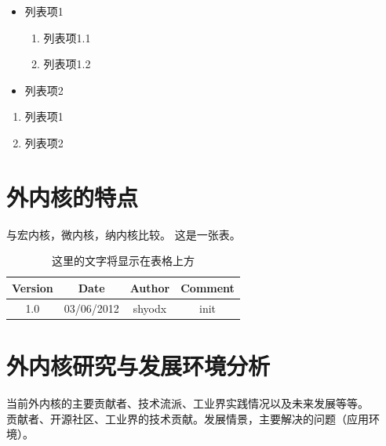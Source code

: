 \documentclass[12pt,openany,a4paper]{report}
\begin{document}
		\begin{itemize}
			\item 列表项1
			\begin{enumerate}
				\item 列表项1.1
				\item 列表项1.2
			\end{enumerate}
			\item 列表项2
		\end{itemize}
		\begin{enumerate}
			\item 列表项1
			\item 列表项2
		\end{enumerate}
		

	\section{外内核的特点}
	与宏内核，微内核，纳内核比较。
	这是一张表。

	\begin{table}[htb]
		\caption[这里的文字将显示在 list of tables 里]{这里的文字将显示在表格上方}
		\begin{center}
			\begin{tabular}{| c | c | c | c |}
			\hline
			Version & Date & Author & Comment \\ \hline
			1.0 & 03/06/2012 & shyodx & init \\ \hline
			\end{tabular}
		\end{center}
	\end{table}
	\section{外内核研究与发展环境分析}
	当前外内核的主要贡献者、技术流派、工业界实践情况以及未来发展等等。\\
	贡献者、开源社区、工业界的技术贡献。发展情景，主要解决的问题（应用环境）。\par
	
\end{document}
